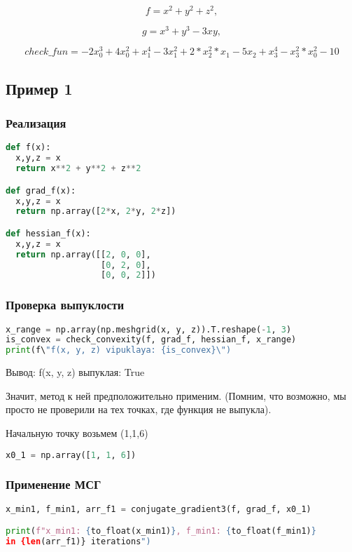 \documentclass{article}
\begin{document}
$$f = x^2 + y^2 + z^2,$$

$$g = x^3 + y^3 - 3xy,$$

$$check\_fun = -2x_0^3 + 4x_0^2 + x_1^4 - 3x_1^2 + 2*x_2^2 * x_1 - 5x_2 + x_3^4 - x_3^2 * x_0^2 - 10$$

\subsection{Пример 1}

\subsubsection{Реализация}
\begin{lstlisting}[language=Python]
def f(x):
  x,y,z = x
  return x**2 + y**2 + z**2

def grad_f(x):
  x,y,z = x
  return np.array([2*x, 2*y, 2*z])

def hessian_f(x):
  x,y,z = x
  return np.array([[2, 0, 0],
                   [0, 2, 0],
                   [0, 0, 2]])
\end{lstlisting}

\subsubsection{Проверка выпуклости}
\begin{lstlisting}[language=Python]
x_range = np.array(np.meshgrid(x, y, z)).T.reshape(-1, 3)
is_convex = check_convexity(f, grad_f, hessian_f, x_range)
print(f\"f(x, y, z) vipuklaya: {is_convex}\")
\end{lstlisting}

Вывод: f(x, y, z) выпуклая: True

Значит, метод к ней предположительно применим. (Помним, что возможно, мы просто не проверили на тех точках, где функция не выпукла).

Начальную точку возьмем (1,1,6)

\begin{lstlisting}[language=Python]
x0_1 = np.array([1, 1, 6])
\end{lstlisting}

\newpage
\subsubsection{Применение МСГ}

\begin{lstlisting}[language=Python]
x_min1, f_min1, arr_f1 = conjugate_gradient3(f, grad_f, x0_1)

print(f"x_min1: {to_float(x_min1)}, f_min1: {to_float(f_min1)}
in {len(arr_f1)} iterations")
\end{lstlisting}
\end{document}
